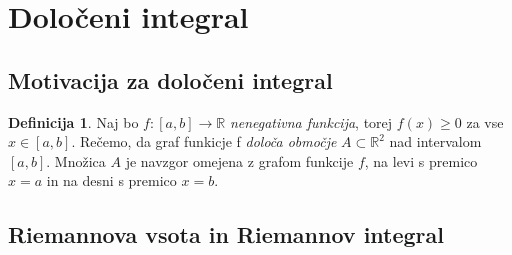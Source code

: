 \documentclass[11pt]{article}
\theoremstyle{definition}
\newtheorem{definicija}{Definicija}[section]
\begin{document}

\pagebreak


\section{Določeni integral}
\vspace{0.5cm}


\subsection{Motivacija za določeni integral}
\vspace{0.5cm}

\begin{definicija}

Naj bo $f:[a, b] \rightarrow \mathbb{R}$ \textit{nenegativna funkcija}, torej $f(x) \geq 0$ za vse $x \in [a, b]$. Rečemo, da graf funkicje f \textit{določa območje} $A \subset \mathbb{R}^2$  nad intervalom $[a, b]$. Množica $A$ je navzgor omejena z grafom funkcije $f$, na levi s premico $x=a$ in na desni s premico $x=b$.

\end{definicija}
\vspace{0.5cm}


\subsection{Riemannova vsota in Riemannov integral}
\vspace{0.5cm}
\end{document}
